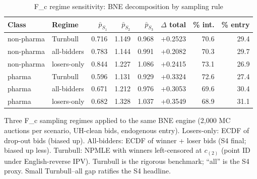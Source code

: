 \begin{table}[htbp]
\centering
\begin{threeparttable}
\caption{F\_c regime sensitivity: BNE decomposition by sampling rule}
\label{tab:v3_sensitivity_fc}
\small
\begin{tabular}{llrrrrrr}
\toprule
Class & Regime & $\bar p_{S_1}$ & $\bar p_{S_2}$ & $\bar p_{S_3}$ & $\Delta$ total & \% int. & \% entry \\
\midrule
non-pharma & Turnbull & 0.716 & 1.149 & 0.968 & +0.2523 & 70.6 & 29.4 \\
non-pharma & all-bidders & 0.783 & 1.144 & 0.991 & +0.2082 & 70.3 & 29.7 \\
non-pharma & losers-only & 0.844 & 1.227 & 1.086 & +0.2415 & 73.1 & 26.9 \\
pharma & Turnbull & 0.596 & 1.131 & 0.929 & +0.3324 & 72.6 & 27.4 \\
pharma & all-bidders & 0.671 & 1.212 & 0.976 & +0.3053 & 69.6 & 30.4 \\
pharma & losers-only & 0.682 & 1.328 & 1.037 & +0.3549 & 68.9 & 31.1 \\
\bottomrule
\end{tabular}
\begin{tablenotes}\footnotesize
\item Three F\_c sampling regimes applied to the same BNE engine
(2{,}000 MC auctions per scenario, UH-clean bids, endogenous entry).
Losers-only: ECDF of drop-out bids (biased up). All-bidders:
ECDF of winner + loser bids (S4 final; biased up less). Turnbull:
NPMLE with winners left-censored at $c_{(2)}$ (point ID under
English-reverse IPV). Turnbull is the rigorous benchmark; ``all''
is the S4 proxy. Small Turnbull--all gap ratifies the S4 headline.
\end{tablenotes}
\end{threeparttable}
\end{table}
